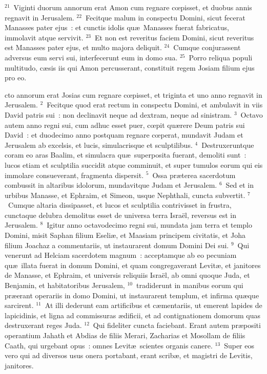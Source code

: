 ${}^{21}$~Viginti duorum annorum erat Amon cum regnare cœpisset, et duobus annis regnavit in Jerusalem.
${}^{22}$~Fecitque malum in conspectu Domini, sicut fecerat Manasses pater ejus~: et cunctis idolis qu\ae\ Manasses fuerat fabricatus, immolavit atque servivit.
${}^{23}$~Et non est reveritus faciem Domini, sicut reveritus est Manasses pater ejus, et multo majora deliquit.
${}^{24}$~Cumque conjurassent adversus eum servi sui, interfecerunt eum in domo sua.
${}^{25}$~Porro reliqua populi multitudo, c\ae sis iis qui Amon percusserant, constituit regem Josiam filium ejus pro eo.

\bchapter
{}cto annorum erat Josias cum regnare cœpisset, et triginta et uno anno regnavit in Jerusalem.
${}^{2}$~Fecitque quod erat rectum in conspectu Domini, et ambulavit in viis David patris sui~: non declinavit neque ad dextram, neque ad sinistram.
${}^{3}$~Octavo autem anno regni sui, cum adhuc esset puer, cœpit qu\ae rere Deum patris sui David~: et duodecimo anno postquam regnare cœperat, mundavit Judam et Jerusalem ab excelsis, et lucis, simulacrisque et sculptilibus.
${}^{4}$~Destruxeruntque coram eo aras Baalim, et simulacra qu\ae\ superposita fuerant, demoliti sunt~: lucos etiam et sculptilia succidit atque comminuit, et super tumulos eorum qui eis immolare consueverant, fragmenta dispersit.
${}^{5}$~Ossa pr\ae terea sacerdotum combussit in altaribus idolorum, mundavitque Judam et Jerusalem.
${}^{6}$~Sed et in urbibus Manasse, et Ephraim, et Simeon, usque Nephthali, cuncta subvertit.
${}^{7}$~Cumque altaria dissipasset, et lucos et sculptilia contrivisset in frustra, cunctaque delubra demolitus esset de universa terra Isra\"el, reversus est in Jerusalem.
${}^{8}$~Igitur anno octavodecimo regni sui, mundata jam terra et templo Domini, misit Saphan filium Eseli\ae , et Maasiam principem civitatis, et Joha filium Joachaz a commentariis, ut instaurarent domum Domini Dei sui.
${}^{9}$~Qui venerunt ad Helciam sacerdotem magnum~: acceptamque ab eo pecuniam qu\ae\ illata fuerat in domum Domini, et quam congregaverant Levit\ae , et janitores de Manasse, et Ephraim, et universis reliquiis Isra\"el, ab omni quoque Juda, et Benjamin, et habitatoribus Jerusalem,
${}^{10}$~tradiderunt in manibus eorum qui pr\ae erant operariis in domo Domini, ut instaurarent templum, et infirma qu\ae que sarcirent.
${}^{11}$~At illi dederunt eam artificibus et c\ae mentariis, ut emerent lapides de lapicidinis, et ligna ad commissuras \ae dificii, et ad contignationem domorum quas destruxerant reges Juda.
${}^{12}$~Qui fideliter cuncta faciebant. Erant autem pr\ae positi operantium Jahath et Abdias de filiis Merari, Zacharias et Mosollam de filiis Caath, qui urgebant opus~: omnes Levit\ae\ scientes organis canere.
${}^{13}$~Super eos vero qui ad diversos usus onera portabant, erant scrib\ae , et magistri de Levitis, janitores.


